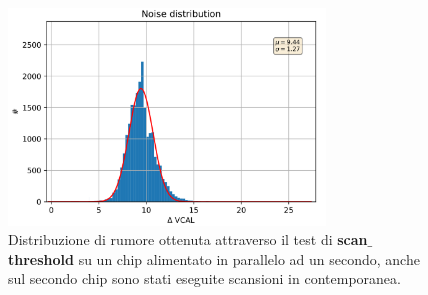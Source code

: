 \begin{figure}
\centering
\includegraphics[width=0.75\textwidth]{Immagini/NoiseParallel}
\caption{Distribuzione di rumore ottenuta attraverso il test di \textbf{scan$\_$threshold} su un chip alimentato in parallelo ad un secondo, anche sul secondo chip sono stati eseguite scansioni in contemporanea.}
\label{noiseparallel}
\end{figure}